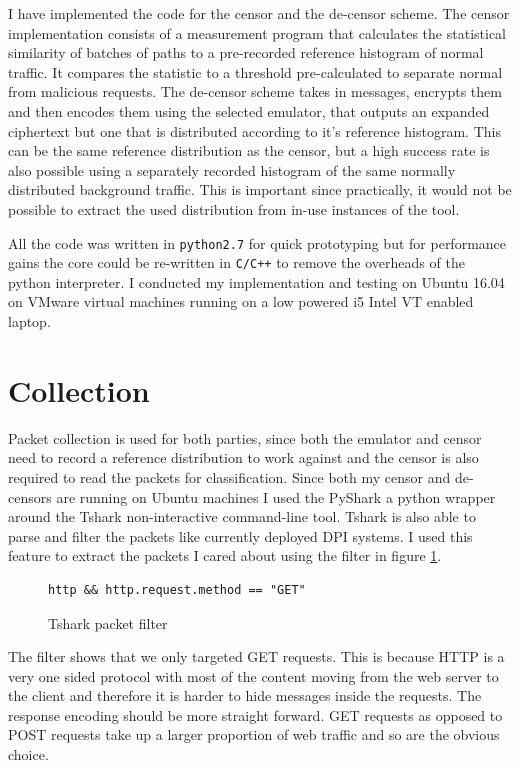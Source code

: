 \documentclass[ %
                    author={Samuel Russell},
                supervisor={Prof. Bogdan Warinschi},
                    degree={MEng},
                     title={Innocuous Ciphertexts},
                  subtitle={The DE-CENSOR Scheme},
                      type={research},
                      year={2018} ]{dissertation}
\begin{document}
I have implemented the code for the censor and the de-censor scheme. The censor implementation consists of a measurement program that calculates the statistical similarity of batches of paths to a pre-recorded reference histogram of normal traffic. It compares the statistic to a threshold pre-calculated to separate normal from malicious requests. The de-censor scheme takes in messages, encrypts them and then encodes them using the selected emulator, that outputs an expanded ciphertext but one that is distributed according to it's reference histogram. This can be the same reference distribution as the censor, but a high success rate is also possible using a separately recorded histogram of the same normally distributed background traffic. This is important since practically, it would not be possible to extract the used distribution from in-use instances of the tool.


All the code was written in \texttt{python2.7} for quick prototyping but for performance gains the core could be re-written in \texttt{C/C++} to remove the overheads of the python interpreter. I conducted my implementation and testing on Ubuntu 16.04 on VMware virtual machines running on a low powered i5 Intel VT enabled laptop.

\section{Collection}

Packet collection is used for both parties, since both the emulator and censor need to record a reference distribution to work against and the censor is also required to read the packets for classification. Since both my censor and de-censors are running on Ubuntu machines I used the PyShark a python wrapper around the Tshark non-interactive command-line tool. Tshark is also able to parse and filter the packets like currently deployed DPI systems. I used this feature to extract the packets I cared about using the filter in figure \ref{fig:filter}.

\begin{figure}[h]
\begin{verbatim}
http && http.request.method == "GET"
\end{verbatim}
\caption{Tshark packet filter}
\label{fig:filter}
\end{figure}

The filter shows that we only targeted GET requests. This is because HTTP is a very one sided protocol with most of the content moving from the web server to the client and therefore it is harder to hide messages inside the requests. The response encoding should be more straight forward. GET requests as opposed to POST requests take up a larger proportion of web traffic and so are the obvious choice. 
\end{document}
